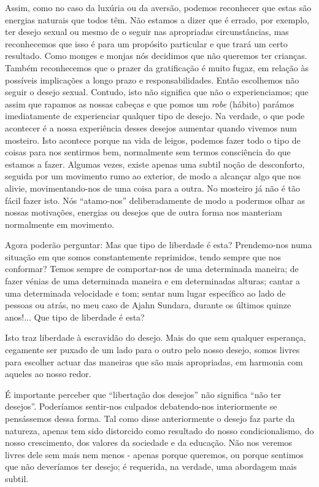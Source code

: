 Assim, como no caso da luxúria ou da aversão, podemos reconhecer que
estas são energias naturais que todos têm. Não estamos a dizer que é
errado, por exemplo, ter desejo sexual ou mesmo de o seguir nas
apropriadas circunstâncias, mas reconhecemos que isso é para um
propósito particular e que trará um certo resultado. Como monges e
monjas nós decidimos que não queremos ter crianças. Também reconhecemos
que o prazer da gratificação é muito fugaz, em relação às possíveis
implicações a longo prazo e responsabilidades. Então escolhemos não
seguir o desejo sexual. Contudo, isto não significa que não o
experienciamos; que assim que rapamos as nossas cabeças e que pomos um
\emph{robe} (hábito) parámos imediatamente de experienciar qualquer tipo
de desejo. Na verdade, o que pode acontecer é a nossa experiência desses
desejos aumentar quando vivemos num mosteiro. Isto acontece porque na
vida de leigos, podemos fazer todo o tipo de coisas para nos sentirmos
bem, normalmente sem termos consciência do que estamos a fazer. Algumas
vezes, existe apenas uma subtil noção de desconforto, seguida por um
movimento rumo ao exterior, de modo a alcançar algo que nos alivie,
movimentando-nos de uma coisa para a outra. No mosteiro já não é tão
fácil fazer isto. Nós ``atamo-nos'' deliberadamente de modo a podermos
olhar as nossas motivações, energias ou desejos que de outra forma nos
manteriam normalmente em movimento.

Agora poderão perguntar: Mas que tipo de liberdade é esta? Prendemo-nos
numa situação em que somos constantemente reprimidos, tendo sempre que
nos conformar? Temos sempre de comportar-nos de uma determinada maneira;
de fazer vénias de uma determinada maneira e em determinadas alturas;
cantar a uma determinada velocidade e tom; sentar num lugar específico
ao lado de pessoas ou atrás, no meu caso de Ajahn Sundara, durante os
últimos quinze anos!... Que tipo de liberdade é esta?

Isto traz liberdade à escravidão do desejo. Mais do que sem qualquer
esperança, cegamente ser puxado de um lado para o outro pelo nosso
desejo, somos livres para escolher actuar das maneiras que são mais
apropriadas, em harmonia com aqueles ao nosso redor.

É importante perceber que ``libertação dos desejos'' não significa ``não
ter desejos''. Poderíamos sentir-nos culpados debatendo-nos
interiormente se pensássemos dessa forma. Tal como disse anteriormente o
desejo faz parte da natureza, apenas tem sido distorcido como resultado
do nosso condicionalismo, do nosso crescimento, dos valores da sociedade
e da educação. Não nos veremos livres dele sem mais nem menos - apenas
porque queremos, ou porque sentimos que não deveríamos ter desejo; é
requerida, na verdade, uma abordagem mais subtil.


